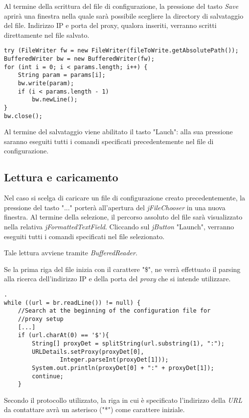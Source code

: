 Al termine della scrittura del file di configurazione, la pressione del tasto \textit{Save} aprir\`{a} una finestra nella quale sar\`{a} possibile scegliere la directory di salvataggio del file.
Indirizzo IP e porta del proxy, qualora inseriti, verranno scritti direttamente nel file salvato.

\vspace{0.5cm}
\begin{lstlisting}
try (FileWriter fw = new FileWriter(fileToWrite.getAbsolutePath()); 
BufferedWriter bw = new BufferedWriter(fw);
for (int i = 0; i < params.length; i++) {
	String param = params[i];
	bw.write(param);
	if (i < params.length - 1)
		bw.newLine();
} 
bw.close();     
\end{lstlisting}

Al termine del salvataggio viene abilitato il tasto "Lauch": alla sua pressione saranno eseguiti tutti i comandi specificati precedentemente nel file di configurazione.

\subsection{Lettura e caricamento}
Nel caso si scelga di caricare un file di configurazione creato precedentemente, la pressione del tasto "..." porter\`{a} all'apertura del \textit{jFileChooser} in una nuova finestra.
Al termine della selezione, il percorso assoluto del file sar\`{a} visualizzato nella relativa \textit{jFormattedTextField}. 
Cliccando sul \textit{jButton} "Launch", verranno eseguiti tutti i comandi specificati nel file selezionato.

Tale lettura avviene tramite \textit{BufferedReader}.

Se la prima riga del file inizia con il carattere "\$", ne verr\`{a} effettuato il parsing alla ricerca dell'indirizzo IP e della porta del \textit{proxy} che si intende utilizzare. 

\begin{lstlisting}.
while ((url = br.readLine()) != null) {
	//Search at the beginning of the configuration file for 
	//proxy setup
	[...]
	if (url.charAt(0) == '$'){
		String[] proxyDet = splitString(url.substring(1), ":");
		URLDetails.setProxy(proxyDet[0], 
				Integer.parseInt(proxyDet[1]));
		System.out.println(proxyDet[0] + ":" + proxyDet[1]);
		continue;
	}
\end{lstlisting}

Secondo il protocollo utilizzato, la riga in cui \`{e} specificato l'indirizzo della \textit{URL} da contattare avr\`{a} un asterisco ("*") come carattere iniziale.

